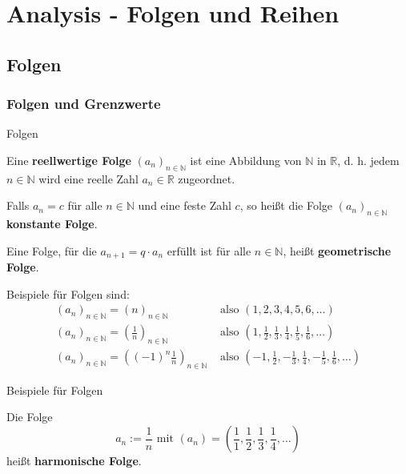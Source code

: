 \section{Analysis - Folgen und Reihen}
\subsection{Folgen}
\subsubsection{Folgen und Grenzwerte}
\begin{frame}{Folgen}
	\begin{definition}
		Eine \textbf{reellwertige Folge} $(a_{n})_{n \in \mathbb{N}}$ ist eine Abbildung von $\mathbb{N}$ in $\mathbb{R}$, d. h. jedem $n \in \mathbb{N}$ wird eine reelle Zahl $a_{n} \in \mathbb{R}$ zugeordnet.
		
		Falls $a_{n} = c$ für alle $n \in \mathbb{N}$ und eine feste Zahl $c$, so heißt die Folge $(a_{n})_{n \in \mathbb{N}}$ \textbf{konstante Folge}.
		
		Eine Folge, für die $a_{n+1} = q \cdot a_{n}$ erfüllt ist für alle $n \in \mathbb{N}$, heißt \textbf{geometrische Folge}.
	\end{definition}
	\begin{example}
		Beispiele für Folgen sind:
		\begin{align*}
			(a_{n})_{n \in \mathbb{N}} = (n)_{n \in \mathbb{N}} & \mbox{ also } (1, 2, 3, 4, 5, 6, \ldots) \\
			(a_{n})_{n \in \mathbb{N}} = \left(\frac{1}{n}\right)_{n \in \mathbb{N}} & \mbox{ also } (1, \frac{1}{2}, \frac{1}{3}, \frac{1}{4}, \frac{1}{5}, \frac{1}{6}, \ldots) \\
			(a_{n})_{n \in \mathbb{N}} = \left((-1)^{n}\frac{1}{n}\right)_{n \in \mathbb{N}} & \mbox{ also } (-1, \frac{1}{2}, -\frac{1}{3}, \frac{1}{4}, -\frac{1}{5}, \frac{1}{6}, \ldots)	
		\end{align*}
	\end{example}
\end{frame}

\begin{frame}{Beispiele für Folgen}
	\begin{definition}
		Die Folge
		\[
		a_{n} := \frac{1}{n} \mbox{ mit } \left(a_{n}\right) = \left(\frac{1}{1}, \frac{1}{2}, \frac{1}{3}, \frac{1}{4}, \ldots \right)
		\] heißt \textbf{harmonische Folge}.
	\end{definition}
	
\end{frame}

